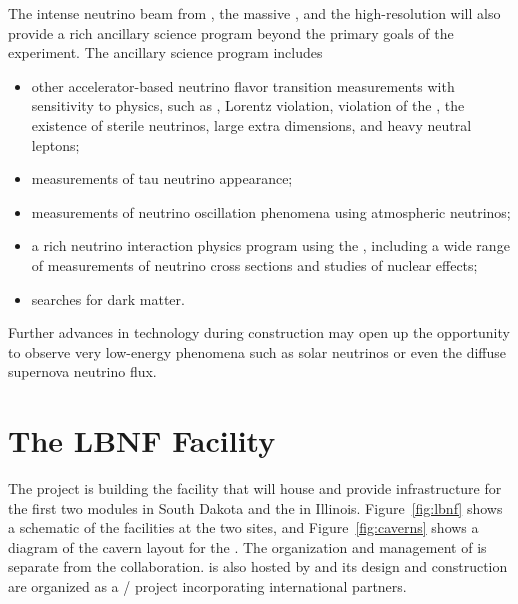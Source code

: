 The intense neutrino beam from , the massive   , and the high-resolution
  will also provide a rich ancillary science program beyond the primary goals of the experiment. The ancillary science program includes
\begin{itemize}
     \item other accelerator-based neutrino flavor transition measurements with sensitivity to  physics, such as , Lorentz violation,  violation of the , the existence of sterile neutrinos, large extra dimensions, and heavy neutral leptons;
     \item measurements of tau neutrino appearance;
     \item measurements of neutrino oscillation phenomena using atmospheric neutrinos;
     \item a rich neutrino interaction physics program using the  , including a wide range of measurements of neutrino cross sections and studies of nuclear effects; 
     \item  searches for dark matter.
\end{itemize} 
Further advances in  
technology during   construction may open up the opportunity
to observe very low-energy phenomena such as solar neutrinos or even the diffuse supernova neutrino flux.


\section{The LBNF Facility} 

The  project is building the facility that will house and provide infrastructure for the first two   modules  in South Dakota  and the  in Illinois.  Figure~\ref{fig:lbnf} shows
a schematic of the facilities at the two sites, and Figure~\ref{fig:caverns} shows a diagram of the cavern layout for the .  
The organization and management of  is separate from the  collaboration.  is also hosted by  and its design and construction are organized as a / project incorporating international partners. 


